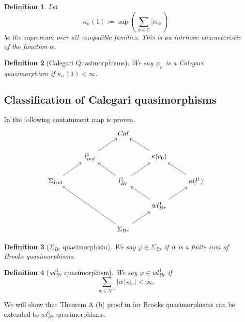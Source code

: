 \documentclass[leqno]{article}
\newtheorem*{definition}{Definition}
\begin{document}
\begin{definition} Let
  \[
  \kappa_\alpha (1):= \sup \left( \sum_{w\in C} |\alpha _w| \right) 
  \] 
  be the supremum over all compatible families. This is an intrinsic characteristic of the function $\alpha$.
\end{definition}

\begin{definition}[Calegari Quasimorphisms] We say $\varphi _\alpha $ is a Calegari quasimorphism if $\kappa_{\alpha }(1) < \infty$.
\end{definition}

\subsection{Classification of Calegari quasimorphisms}
In \cite{fournier}  the following containment map is proven.
\[\begin{tikzcd}
	&& Cal \\
	& {l^1_{ind}} && {\kappa(c_0)} \\
	{\Sigma_{Ind}} && {l^1_{Br}} && {\kappa(l^1)} \\
	&&& {wl^1_{Br}} \\
	&& {\Sigma_{Br}}
	\arrow[from=5-3, to=3-1]
	\arrow[from=5-3, to=4-4]
	\arrow[from=4-4, to=3-5]
	\arrow[from=4-4, to=3-3]
	\arrow[from=3-5, to=2-4]
	\arrow[from=3-3, to=2-4]
	\arrow[from=2-4, to=1-3]
	\arrow[from=3-1, to=2-2]
	\arrow[from=2-2, to=1-3]
	\arrow[from=3-3, to=2-2]
\end{tikzcd}\]

\begin{definition}[$ \Sigma _{Br}$ quasimorphism] We say  $\varphi \in \Sigma _{Br}$ if it is a finite sum of Brooks quasimorphisms.
\end{definition}

\begin{definition}[$wl^1_{Br}$ quasimorphism] We say  $\varphi \in wl^1_{Br}$ if
  \[
\sum_{w\in \mathcal{N}^+}  |w||\alpha _\omega |<\infty .
  \] 
\end{definition}

We will show that Theorem A (b) proof in \cite{amontova} for Brooks quasimorphisms can be extended to $wl^1_{Br}$ quasimorphisms.
\end{document}
